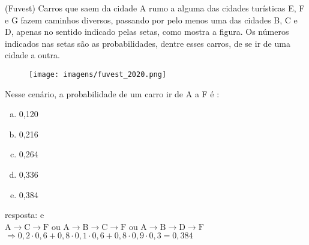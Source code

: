 \begin{ex}
  (Fuvest) Carros que saem da cidade A rumo a alguma das cidades turísticas E, F e G fazem caminhos diversos, passando por pelo menos uma das cidades B, C e D, apenas no sentido indicado pelas setas, como mostra a figura. Os números indicados nas setas são as probabilidades, dentre esses carros, de se ir de uma cidade a outra.
     \begin{figure} [!htb]
         \centering
         \texttt{[image: imagens/fuvest\_2020.png]}
     \end{figure}
 Nesse cenário, a probabilidade de um carro ir de A a F é :
    \begin{enumerate}  [(a)]
        \item 0,120
        \item 0,216
        \item 0,264
        \item 0,336
        \item 0,384
    \end{enumerate}
      \begin{sol}
       resposta: e \\
       $\text{A}\rightarrow\text{C}\rightarrow\text{F}$\hspace{0,2cm} ou\hspace{0,2cm} $\text{A}\rightarrow\text{B}\rightarrow\text{C}\rightarrow\text{F}$\hspace{0,2cm} ou\hspace{0,2cm} $\text{A}\rightarrow\text{B}\rightarrow\text{D}\rightarrow\text{F}$\\
       $\Longrightarrow 0,2\cdot0,6+0,8\cdot0,1\cdot0,6+0,8\cdot0,9\cdot0,3=0,384$
      \end{sol}
 \end{ex}